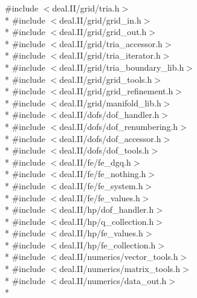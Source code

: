 {\ttfamily \#include $<$deal.\-I\-I/grid/tria.\-h$>$}\\*
{\ttfamily \#include $<$deal.\-I\-I/grid/grid\-\_\-in.\-h$>$}\\*
{\ttfamily \#include $<$deal.\-I\-I/grid/grid\-\_\-out.\-h$>$}\\*
{\ttfamily \#include $<$deal.\-I\-I/grid/tria\-\_\-accessor.\-h$>$}\\*
{\ttfamily \#include $<$deal.\-I\-I/grid/tria\-\_\-iterator.\-h$>$}\\*
{\ttfamily \#include $<$deal.\-I\-I/grid/tria\-\_\-boundary\-\_\-lib.\-h$>$}\\*
{\ttfamily \#include $<$deal.\-I\-I/grid/grid\-\_\-tools.\-h$>$}\\*
{\ttfamily \#include $<$deal.\-I\-I/grid/grid\-\_\-refinement.\-h$>$}\\*
{\ttfamily \#include $<$deal.\-I\-I/grid/manifold\-\_\-lib.\-h$>$}\\*
{\ttfamily \#include $<$deal.\-I\-I/dofs/dof\-\_\-handler.\-h$>$}\\*
{\ttfamily \#include $<$deal.\-I\-I/dofs/dof\-\_\-renumbering.\-h$>$}\\*
{\ttfamily \#include $<$deal.\-I\-I/dofs/dof\-\_\-accessor.\-h$>$}\\*
{\ttfamily \#include $<$deal.\-I\-I/dofs/dof\-\_\-tools.\-h$>$}\\*
{\ttfamily \#include $<$deal.\-I\-I/fe/fe\-\_\-dgq.\-h$>$}\\*
{\ttfamily \#include $<$deal.\-I\-I/fe/fe\-\_\-nothing.\-h$>$}\\*
{\ttfamily \#include $<$deal.\-I\-I/fe/fe\-\_\-system.\-h$>$}\\*
{\ttfamily \#include $<$deal.\-I\-I/fe/fe\-\_\-values.\-h$>$}\\*
{\ttfamily \#include $<$deal.\-I\-I/hp/dof\-\_\-handler.\-h$>$}\\*
{\ttfamily \#include $<$deal.\-I\-I/hp/q\-\_\-collection.\-h$>$}\\*
{\ttfamily \#include $<$deal.\-I\-I/hp/fe\-\_\-values.\-h$>$}\\*
{\ttfamily \#include $<$deal.\-I\-I/hp/fe\-\_\-collection.\-h$>$}\\*
{\ttfamily \#include $<$deal.\-I\-I/numerics/vector\-\_\-tools.\-h$>$}\\*
{\ttfamily \#include $<$deal.\-I\-I/numerics/matrix\-\_\-tools.\-h$>$}\\*
{\ttfamily \#include $<$deal.\-I\-I/numerics/data\-\_\-out.\-h$>$}\\*
